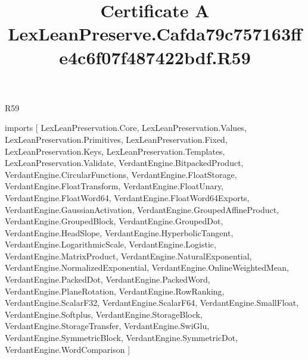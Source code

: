 \begin{lexlean}{R59}
\title{Certificate A LexLeanPreserve.Cafda79c757163ffe4c6f07f487422bdf.R59}
\begin{coremodule}
imports [
  LexLeanPreservation.Core,
  LexLeanPreservation.Values,
  LexLeanPreservation.Primitives,
  LexLeanPreservation.Fixed,
  LexLeanPreservation.Keys,
  LexLeanPreservation.Templates,
  LexLeanPreservation.Validate,
  VerdantEngine.BitpackedProduct,
  VerdantEngine.CircularFunctions,
  VerdantEngine.FloatStorage,
  VerdantEngine.FloatTransform,
  VerdantEngine.FloatUnary,
  VerdantEngine.FloatWord64,
  VerdantEngine.FloatWord64Exports,
  VerdantEngine.GaussianActivation,
  VerdantEngine.GroupedAffineProduct,
  VerdantEngine.GroupedBlock,
  VerdantEngine.GroupedDot,
  VerdantEngine.HeadSlope,
  VerdantEngine.HyperbolicTangent,
  VerdantEngine.LogarithmicScale,
  VerdantEngine.Logistic,
  VerdantEngine.MatrixProduct,
  VerdantEngine.NaturalExponential,
  VerdantEngine.NormalizedExponential,
  VerdantEngine.OnlineWeightedMean,
  VerdantEngine.PackedDot,
  VerdantEngine.PackedWord,
  VerdantEngine.PlaneRotation,
  VerdantEngine.RowRanking,
  VerdantEngine.ScalarF32,
  VerdantEngine.ScalarF64,
  VerdantEngine.SmallFloat,
  VerdantEngine.Softplus,
  VerdantEngine.StorageBlock,
  VerdantEngine.StorageTransfer,
  VerdantEngine.SwiGlu,
  VerdantEngine.SymmetricBlock,
  VerdantEngine.SymmetricDot,
  VerdantEngine.WordComparison
]


\end{coremodule}
\end{lexlean}
